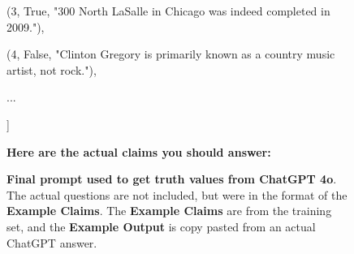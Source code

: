 \begin{figure}[tb]
{\begin{minipage}{\dimexpr \textwidth-2\fboxsep-2\fboxrule\relax}
\qquad    (3, True, "300 North LaSalle in Chicago was indeed completed in 2009."),

\qquad    (4, False, "Clinton Gregory is primarily known as a country music artist, not rock."),

    ...

]

\textbf{Here are the actual claims you should answer:}
\end{minipage}}
\caption{\textbf{Final prompt used to get truth values from ChatGPT 4o}. The actual questions are not included, but were in the format of the \textbf{Example Claims}. The \textbf{Example Claims} are from the training set, and the \textbf{Example Output} is copy pasted from an actual ChatGPT answer.}
\label{fig:chatgpt_prompt}
\end{figure}

